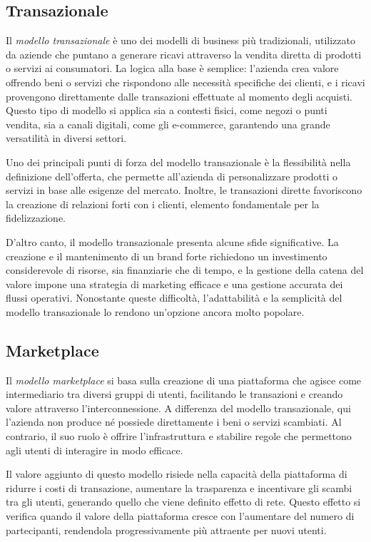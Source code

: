 \subsection*{Transazionale}
Il \textit{modello transazionale} è uno dei modelli di business più tradizionali, utilizzato da aziende che puntano a generare ricavi attraverso la vendita diretta di prodotti o servizi ai consumatori. La logica alla base è semplice: l’azienda crea valore offrendo beni o servizi che rispondono alle necessità specifiche dei clienti, e i ricavi provengono direttamente dalle transazioni effettuate al momento degli acquisti. Questo tipo di modello si applica sia a contesti fisici, come negozi o punti vendita, sia a canali digitali, come gli e-commerce, garantendo una grande versatilità in diversi settori.

Uno dei principali punti di forza del modello transazionale è la flessibilità nella definizione dell’offerta, che permette all’azienda di personalizzare prodotti o servizi in base alle esigenze del mercato. Inoltre, le transazioni dirette favoriscono la creazione di relazioni forti con i clienti, elemento fondamentale per la fidelizzazione.

D’altro canto, il modello transazionale presenta alcune sfide significative. La creazione e il mantenimento di un brand forte richiedono un investimento considerevole di risorse, sia finanziarie che di tempo, e la gestione della catena del valore impone una strategia di marketing efficace e una gestione accurata dei flussi operativi. Nonostante queste difficoltà, l’adattabilità e la semplicità del modello transazionale lo rendono un’opzione ancora molto popolare.

\subsection*{Marketplace}
Il \textit{modello marketplace} si basa sulla creazione di una piattaforma che agisce come intermediario tra diversi gruppi di utenti, facilitando le transazioni e creando valore attraverso l’interconnessione. A differenza del modello transazionale, qui l’azienda non produce né possiede direttamente i beni o servizi scambiati. Al contrario, il suo ruolo è offrire l’infrastruttura e stabilire regole che permettono agli utenti di interagire in modo efficace.

Il valore aggiunto di questo modello risiede nella capacità della piattaforma di ridurre i costi di transazione, aumentare la trasparenza e incentivare gli scambi tra gli utenti, generando quello che viene definito effetto di rete. Questo effetto si verifica quando il valore della piattaforma cresce con l’aumentare del numero di partecipanti, rendendola progressivamente più attraente per nuovi utenti.

